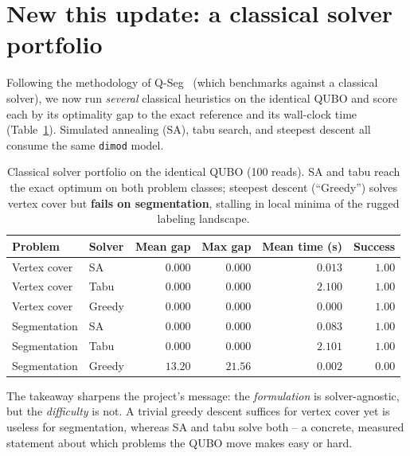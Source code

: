 \documentclass[11pt]{article}
\newcommand{\code}[1]{\texttt{\small #1}}
\begin{document}
\section{New this update: a classical solver portfolio}
Following the methodology of Q-Seg~\cite{qseg} (which benchmarks against a
classical solver), we now run \emph{several} classical heuristics on the
identical QUBO and score each by its optimality gap to the exact reference and
its wall-clock time (Table~\ref{tab:portfolio}). Simulated annealing (SA), tabu
search, and steepest descent all consume the same \code{dimod} model.

\begin{table}[h]
\centering
\caption{Classical solver portfolio on the identical QUBO (100 reads). SA and
tabu reach the exact optimum on both problem classes; steepest descent
(``Greedy'') solves vertex cover but \textbf{fails on segmentation}, stalling in
local minima of the rugged labeling landscape.}
\label{tab:portfolio}
\small
\begin{tabular}{llrrrr}
\toprule
Problem & Solver & Mean gap & Max gap & Mean time (s) & Success \\
\midrule
Vertex cover & SA     & $0.000$  & $0.000$  & $0.013$ & $1.00$ \\
Vertex cover & Tabu   & $0.000$  & $0.000$  & $2.100$ & $1.00$ \\
Vertex cover & Greedy & $0.000$  & $0.000$  & $0.000$ & $1.00$ \\
Segmentation & SA     & $0.000$  & $0.000$  & $0.083$ & $1.00$ \\
Segmentation & Tabu   & $0.000$  & $0.000$  & $2.101$ & $1.00$ \\
Segmentation & Greedy & $13.20$  & $21.56$  & $0.002$ & $0.00$ \\
\bottomrule
\end{tabular}
\end{table}

\noindent The takeaway sharpens the project's message: the \emph{formulation} is
solver-agnostic, but the \emph{difficulty} is not. A trivial greedy descent
suffices for vertex cover yet is useless for segmentation, whereas SA and tabu
solve both -- a concrete, measured statement about which problems the QUBO move
makes easy or hard.
\end{document}
